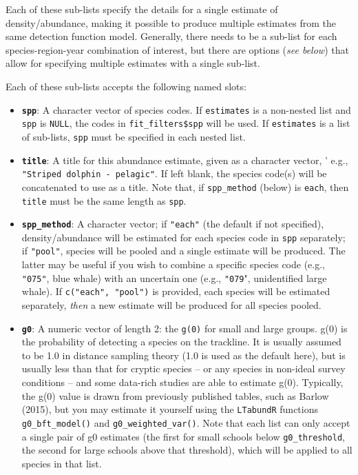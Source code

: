 \documentclass[
]{book}
\begin{document}
Each of these sub-lists specify the details for a single estimate of density/abundance, making it possible to produce multiple estimates from the same detection function model. Generally, there needs to be a sub-list for each species-region-year combination of interest, but there are options (\emph{see below}) that allow for specifying multiple estimates with a single sub-list.

Each of these sub-lists accepts the following named slots:

\begin{itemize}
\item
  \textbf{\texttt{spp}}: A character vector of species codes. If \texttt{estimates} is a non-nested list and \texttt{spp} is \texttt{NULL}, the codes in \texttt{fit\_filters\$spp} will be used. If \texttt{estimates} is a list of sub-lists, \texttt{spp} must be specified in each nested list.
\item
  \textbf{\texttt{title}}: A title for this abundance estimate, given as a character vector, ' e.g., \texttt{"Striped\ dolphin\ -\ pelagic"}. If left blank, the species code(s) will be concatenated to use as a title. Note that, if \texttt{spp\_method} (below) is \texttt{\textquotesingle{}each\textquotesingle{}}, then \texttt{title} must be the same length as \texttt{spp}.
\item
  \textbf{\texttt{spp\_method}}: A character vector; if \texttt{"each"} (the default if not specified), density/abundance will be estimated for each species code in \texttt{spp} separately; if \texttt{"pool"}, species will be pooled and a single estimate will be produced. The latter may be useful if you wish to combine a specific species code (e.g., \texttt{"075"}, blue whale) with an uncertain one (e.g., \texttt{"079}", unidentified large whale). If \texttt{c("each",\ "pool")} is provided, each species will be estimated separately, \emph{then} a new estimate will be produced for all species pooled.
\item
  \textbf{\texttt{g0}}: A numeric vector of length 2: the \texttt{g(0)} for small and large groups. g(0) is the probability of detecting a species on the trackline. It is usually assumed to be 1.0 in distance sampling theory (1.0 is used as the default here), but is usually less than that for cryptic species -- or any species in non-ideal survey conditions -- and some data-rich studies are able to estimate g(0). Typically, the g(0) value is drawn from previously published tables, such as Barlow (2015), but you may estimate it yourself using the \texttt{LTabundR} functions \texttt{g0\_bft\_model()} and \texttt{g0\_weighted\_var()}. Note that each list can only accept a single pair of g0 estimates (the first for small schools below \texttt{g0\_threshold}, the second for large schools above that threshold), which will be applied to all species in that list.

\end{itemize}
\end{document}
